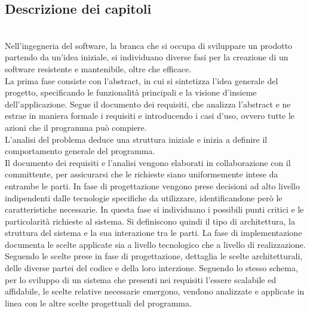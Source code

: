 \clearpage

\subsection{Descrizione dei capitoli}
\\
Nell'ingegneria del software, la branca che si occupa di sviluppare un prodotto partendo da un'idea iniziale, 
si individuano diverse fasi per la creazione di un software resistente e mantenibile, oltre che efficace.\\

    La prima fase consiste con l'abstract, in cui si sintetizza l'idea generale del progetto, 
    specificando le funzionalità principali e la visione d'insieme dell'applicazione.
    Segue il documento dei requisiti, che analizza l'abstract e ne estrae in maniera formale i requisiti e introducendo i casi d'uso, 
    ovvero tutte le azioni che il programma può compiere.\\
    L'analisi del problema deduce una struttura iniziale e inizia a definire il comportamento generale del programma.\\
    Il documento dei requisiti e l'analisi vengono elaborati in collaborazione con il committente, 
    per assicurarsi che le richieste siano uniformemente intese da entrambe le parti.
    In fase di progettazione vengono prese decisioni ad alto livello indipendenti dalle tecnologie specifiche da utilizzare, 
    identificandone però le caratteristiche necessarie. 
    In questa fase si individuano i possibili punti critici e le particolarità richieste al sistema.
    Si definiscono quindi il tipo di architettura, la struttura del sistema e la sua interazione tra le parti.
    La fase di implementazione documenta le scelte applicate sia a livello tecnologico che a livello di realizzazione. 
    Seguendo le scelte prese in fase di progettazione, dettaglia le scelte architetturali, delle diverse partei del codice e della loro interzione.
Seguendo lo stesso schema, per lo sviluppo di un sistema che presenti nei requisiti l'essere scalabile ed affidabile, 
le scelte relative necessarie emergono, vendono analizzate e applicate in linea con le altre scelte progettuali del programma.\\
\clearpage



